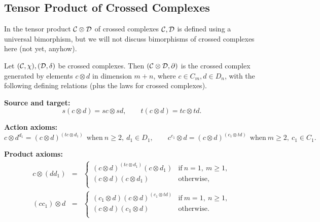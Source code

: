 \subsection{Tensor Product of Crossed Complexes} 
\label{subsect:xcomp-tensor}

In \cite{brow:siv} the tensor product $\mathcal{C}\otimes\mathcal{D}$ of 
crossed complexes $\mathcal{C},\mathcal{D}$ is defined using a universal bimorphism, 
but we will not discuss bimorphisms of crossed complexes here 
(not yet, anyhow). 

\begin{defn} \label{defn:xcomp-tensor}
Let $(\mathcal{C},\chi),(\mathcal{D},\delta)$ be crossed complexes. 
Then $(\mathcal{C}\otimes\mathcal{D},\partial)$ is the crossed complex generated 
by elements $c \otimes d$ in dimension $m+n$, where $c \in C_m, d \in D_n$, 
with the following defining relations (plus the laws for crossed complexes). 

\medskip\noindent
{\bf Source and target:}
$$
s(c \otimes d) = sc \otimes sd, \qquad
t(c \otimes d) = tc \otimes td.  
$$

\medskip\noindent
{\bf Action axioms:}
$$
c \otimes d^{d_1} = (c \otimes d)^{(tc \otimes d_1)}~~ 
\text{when}~ n \geqslant 2,~ d_1 \in D_1, \qquad
c^{c_1} \otimes d = (c \otimes d)^{(c_1 \otimes td)}~~ 
\text{when}~ m \geqslant 2,~ c_1 \in C_1.
$$

\medskip\noindent
{\bf Product axioms:}
\begin{eqnarray*}
c \otimes (dd_1) &=& \left\{ \begin{array}{ll} 
                    (c \otimes d)^{(tc \otimes d_1)}(c \otimes d_1) 
                       & \text{if}~ n=1,~ m \geqslant 1, \\
                    (c \otimes d)(c \otimes d_1) 
                       & \text{otherwise}, \\
                    \end{array} \right.                            \\
(cc_1) \otimes d &=& \left\{ \begin{array}{ll} 
                    (c_1 \otimes d)(c \otimes d)^{(c_1 \otimes td)} 
                       & \text{if}~ m=1,~ n \geqslant 1, \\
                    (c \otimes d)(c_1 \otimes d) 
                       & \text{otherwise}. \\
                    \end{array} \right. 
\end{eqnarray*}


\end{defn}
